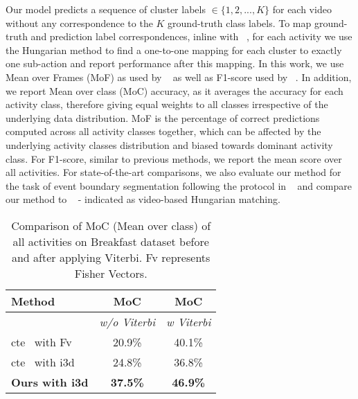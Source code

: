 \documentclass[final]{cvpr}
\begin{document}
 Our model predicts a sequence of cluster labels $ \in \{1,2,...,K\}$ for each video without any correspondence to the $K$ ground-truth class labels. To map ground-truth and prediction label correspondences, inline with ~\cite{Alayrac16unsupervised, sener2018unsupervised, kukleva2019unsupervised}, for each activity we use the Hungarian method to find a one-to-one mapping for each cluster to exactly one sub-action and report performance after this mapping. 
In this work, we use Mean over Frames (MoF) as used by ~\cite{sener2018unsupervised,kukleva2019unsupervised} as well as F1-score used by ~\cite{Alayrac16unsupervised}. In addition,  we report Mean over class (MoC) accuracy,  as it averages the accuracy for each activity class, therefore giving equal weights to all classes irrespective of the underlying data distribution. MoF is the percentage of correct predictions computed across all activity classes together, which can be affected by the underlying activity classes distribution and biased towards dominant activity class. For F1-score, similar to previous methods, we  report the mean score over all activities. For state-of-the-art comparisons, we also evaluate our method for the task of event boundary segmentation following the protocol in ~\cite{aakur2019perceptual} and compare our method to ~\cite{aakur2019perceptual} - indicated as video-based Hungarian matching. 



\begin{table}[t]
\vspace{-0.2cm}
    \caption{{\small Comparison of MoC (Mean over class) of all activities on Breakfast dataset before and after applying Viterbi. {\sc Fv} represents Fisher Vectors.}}
    \label{tab:avg_acc}
    \centering
    \small
    \begin{tabular}{lcc}
        \toprule
        {\bf Method} & {\bf MoC} & {\bf MoC}\\
        \midrule
         & \textit{w/o Viterbi} & \textit{w Viterbi} \\
         \midrule
        {\sc cte}~\cite{kukleva2019unsupervised} with {\sc Fv} & 20.9\% & 40.1\% \\
        {\sc cte}~\cite{kukleva2019unsupervised} with {\sc i3d} & 24.8\% & 36.8\% \\
        \midrule
        \textbf{Ours with {\sc i3d}} & \textbf{37.5\%} &\textbf{46.9\%} \\
        \bottomrule
    \end{tabular}
\end{table}
\end{document}
